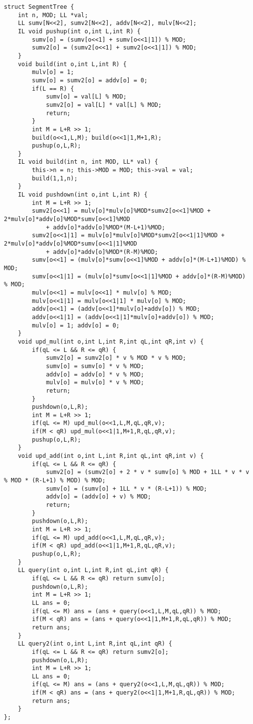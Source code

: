 \documentclass[UTF8]{ctexart}
\begin{document}
\begin{framed}
\begin{lstlisting}
struct SegmentTree {
    int n, MOD; LL *val;
    LL sumv[N<<2], sumv2[N<<2], addv[N<<2], mulv[N<<2];
    IL void pushup(int o,int L,int R) {
        sumv[o] = (sumv[o<<1] + sumv[o<<1|1]) % MOD;
        sumv2[o] = (sumv2[o<<1] + sumv2[o<<1|1]) % MOD;
    }
    void build(int o,int L,int R) {
        mulv[o] = 1; 
        sumv[o] = sumv2[o] = addv[o] = 0;
        if(L == R) {
            sumv[o] = val[L] % MOD;
            sumv2[o] = val[L] * val[L] % MOD;
            return;
        }
        int M = L+R >> 1;
        build(o<<1,L,M); build(o<<1|1,M+1,R);
        pushup(o,L,R);
    }
    IL void build(int n, int MOD, LL* val) {
        this->n = n; this->MOD = MOD; this->val = val;
        build(1,1,n);
    }
    IL void pushdown(int o,int L,int R) {
        int M = L+R >> 1;
        sumv2[o<<1] = mulv[o]*mulv[o]%MOD*sumv2[o<<1]%MOD + 2*mulv[o]*addv[o]%MOD*sumv[o<<1]%MOD
            + addv[o]*addv[o]%MOD*(M-L+1)%MOD;
        sumv2[o<<1|1] = mulv[o]*mulv[o]%MOD*sumv2[o<<1|1]%MOD + 2*mulv[o]*addv[o]%MOD*sumv[o<<1|1]%MOD
            + addv[o]*addv[o]%MOD*(R-M)%MOD;
        sumv[o<<1] = (mulv[o]*sumv[o<<1]%MOD + addv[o]*(M-L+1)%MOD) % MOD;
        sumv[o<<1|1] = (mulv[o]*sumv[o<<1|1]%MOD + addv[o]*(R-M)%MOD) % MOD;
        mulv[o<<1] = mulv[o<<1] * mulv[o] % MOD;
        mulv[o<<1|1] = mulv[o<<1|1] * mulv[o] % MOD;
        addv[o<<1] = (addv[o<<1]*mulv[o]+addv[o]) % MOD;
        addv[o<<1|1] = (addv[o<<1|1]*mulv[o]+addv[o]) % MOD;
        mulv[o] = 1; addv[o] = 0;
    }
    void upd_mul(int o,int L,int R,int qL,int qR,int v) {
        if(qL <= L && R <= qR) {
            sumv2[o] = sumv2[o] * v % MOD * v % MOD;
            sumv[o] = sumv[o] * v % MOD;
            addv[o] = addv[o] * v % MOD;
            mulv[o] = mulv[o] * v % MOD; 
            return;
        }
        pushdown(o,L,R);
        int M = L+R >> 1;
        if(qL <= M) upd_mul(o<<1,L,M,qL,qR,v);
        if(M < qR) upd_mul(o<<1|1,M+1,R,qL,qR,v);
        pushup(o,L,R);
    } 
    void upd_add(int o,int L,int R,int qL,int qR,int v) {
        if(qL <= L && R <= qR) {
            sumv2[o] = (sumv2[o] + 2 * v * sumv[o] % MOD + 1LL * v * v % MOD * (R-L+1) % MOD) % MOD;
            sumv[o] = (sumv[o] + 1LL * v * (R-L+1)) % MOD;
            addv[o] = (addv[o] + v) % MOD;
            return;
        }
        pushdown(o,L,R);
        int M = L+R >> 1;
        if(qL <= M) upd_add(o<<1,L,M,qL,qR,v);
        if(M < qR) upd_add(o<<1|1,M+1,R,qL,qR,v);
        pushup(o,L,R);
    }
    LL query(int o,int L,int R,int qL,int qR) {
        if(qL <= L && R <= qR) return sumv[o];
        pushdown(o,L,R);
        int M = L+R >> 1;
        LL ans = 0;
        if(qL <= M) ans = (ans + query(o<<1,L,M,qL,qR)) % MOD;
        if(M < qR) ans = (ans + query(o<<1|1,M+1,R,qL,qR)) % MOD;
        return ans;
    }
    LL query2(int o,int L,int R,int qL,int qR) {
        if(qL <= L && R <= qR) return sumv2[o];
        pushdown(o,L,R);
        int M = L+R >> 1;
        LL ans = 0;
        if(qL <= M) ans = (ans + query2(o<<1,L,M,qL,qR)) % MOD;
        if(M < qR) ans = (ans + query2(o<<1|1,M+1,R,qL,qR)) % MOD;
        return ans;
    }
}; 
\end{lstlisting}
\end{framed}
\end{document}
